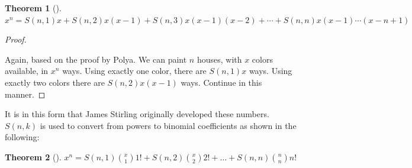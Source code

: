 \documentclass[10pt,]{book}
\theoremstyle{plain}
\newtheorem{theorem}{Theorem}[section]
\theoremstyle{definition}
\theoremstyle{definition}
\numberwithin{equation}{chapter}
\begin{document}
\begin{theorem}[{}]\label{thm-stirling-polynomial}
\hypertarget{p-126}{}%
\(x^{n} = S\left( n,1 \right)x + S\left( n,2 \right)x\left( x - 1 \right) + S\left( n,3 \right)x\left( x - 1 \right)\left( x - 2 \right) + \cdots
+ S\left( n,n \right)x\left( x - 1 \right)\cdots(x - n + 1)\)%
\end{theorem}
\begin{proof}\hypertarget{proof-3}{}
\hypertarget{p-127}{}%
Again, based on the proof by Polya. We can paint \(n\) houses, with \(x\) colors available, in \(x^{n}\) ways. Using exactly one color, there are \(S\left( n,1 \right)x\) ways. Using exactly two colors there are \(S\left( n,2 \right)x(x - 1)\) ways. Continue in this manner.%
\end{proof}
\hypertarget{p-128}{}%
It is in this form that James Stirling originally developed these numbers. \(S(n,k)\) is used to convert from powers to binomial  coefficients as shown in the following:%
\begin{theorem}[{}]\label{thm-stirling-polynomial2}
\hypertarget{p-129}{}%
\(x^{n} = S\left( n,1 \right)\binom{x}{1}1! + S\left( n,2 \right) \binom{x}{2}2! + \ldots + S\left( n,n \right)\binom{n}{n} n!\)%
\end{theorem}
\typeout{************************************************}
\typeout{************************************************}
\end{document}

